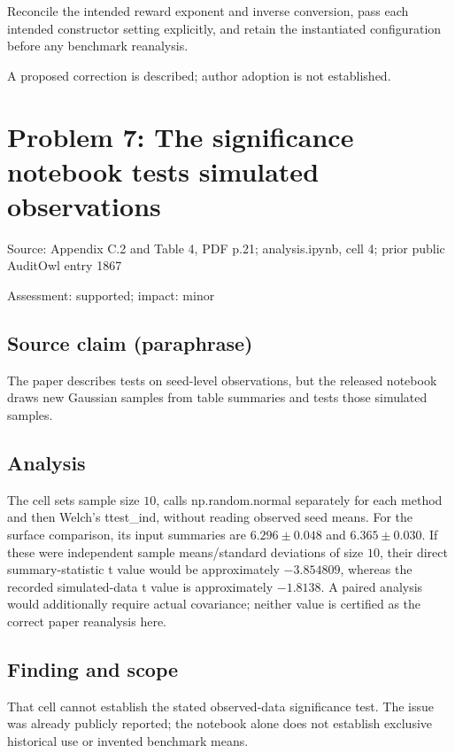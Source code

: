 \documentclass[11pt]{article}
\begin{document}
Reconcile the intended reward exponent and inverse conversion, pass each intended constructor setting explicitly, and retain the instantiated configuration before any benchmark reanalysis.

A proposed correction is described; author adoption is not established.

\section*{Problem 7: The significance notebook tests simulated observations}

Source: Appendix C.2 and Table 4, PDF p.21; analysis.ipynb, cell 4; prior public AuditOwl entry 1867

Assessment: supported; impact: minor

\subsection*{Source claim (paraphrase)}

The paper describes tests on seed-level observations, but the released notebook draws new Gaussian samples from table summaries and tests those simulated samples.

\subsection*{Analysis}

The cell sets sample size \(10\), calls np.random.normal separately for each method and then Welch’s ttest\_ind, without reading observed seed means. For the surface comparison, its input summaries are \(6.296\pm0.048\) and \(6.365\pm0.030\). If these were independent sample means/standard deviations of size \(10\), their direct summary-statistic t value would be approximately \(-3.854809\), whereas the recorded simulated-data t value is approximately \(-1.8138\). A paired analysis would additionally require actual covariance; neither value is certified as the correct paper reanalysis here.

\subsection*{Finding and scope}

That cell cannot establish the stated observed-data significance test. The issue was already publicly reported; the notebook alone does not establish exclusive historical use or invented benchmark means.
\end{document}
